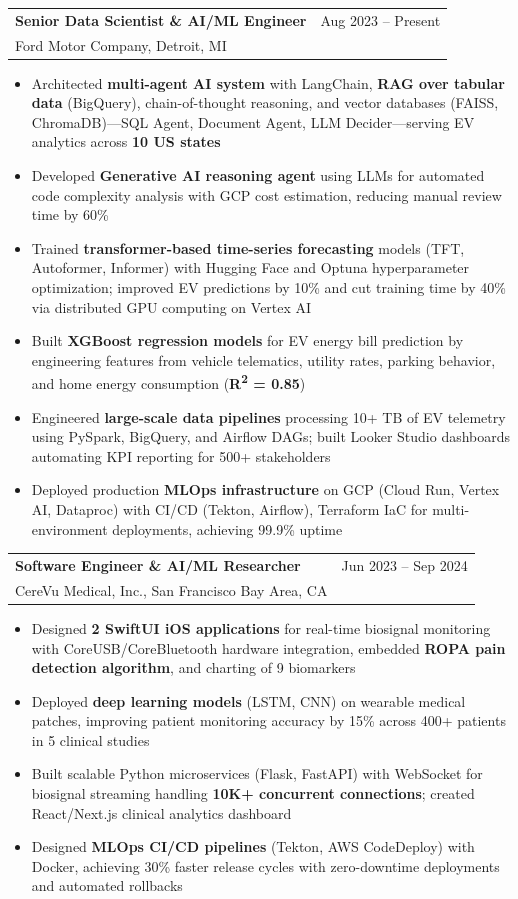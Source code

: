 \documentclass[11pt,letterpaper]{article}
\makeatletter
\newcommand{\cventry}[4]{%
  \noindent\begin{tabularx}{\textwidth}{@{}X r@{}}
    {\bfseries\color{headerblue}#1} & {\color{graytext}\small #2} \\
    {\color{accentcolor}\small #3} & \\
  \end{tabularx}%
  \vspace{0.02em}%
  #4%
  \vspace{0.25em}%
}
\makeatother
\begin{document}
\cventry{Senior Data Scientist \& AI/ML Engineer}{Aug 2023 -- Present}{Ford Motor Company, Detroit, MI}{
\begin{itemize}[leftmargin=0.5cm, itemsep=0.05cm, topsep=0.06cm, label={\color{headerblue}\textbullet}]
  \item Architected \textbf{multi-agent AI system} with LangChain, \textbf{RAG over tabular data} (BigQuery), chain-of-thought reasoning, and vector databases (FAISS, ChromaDB)---SQL Agent, Document Agent, LLM Decider---serving EV analytics across \textbf{10 US states}
  \item Developed \textbf{Generative AI reasoning agent} using LLMs for automated code complexity analysis with GCP cost estimation, reducing manual review time by 60\%
  \item Trained \textbf{transformer-based time-series forecasting} models (TFT, Autoformer, Informer) with Hugging Face and Optuna hyperparameter optimization; improved EV predictions by 10\% and cut training time by 40\% via distributed GPU computing on Vertex AI
  \item Built \textbf{XGBoost regression models} for EV energy bill prediction by engineering features from vehicle telematics, utility rates, parking behavior, and home energy consumption (\textbf{R\textsuperscript{2} = 0.85})
  \item Engineered \textbf{large-scale data pipelines} processing 10+ TB of EV telemetry using PySpark, BigQuery, and Airflow DAGs; built Looker Studio dashboards automating KPI reporting for 500+ stakeholders
  \item Deployed production \textbf{MLOps infrastructure} on GCP (Cloud Run, Vertex AI, Dataproc) with CI/CD (Tekton, Airflow), Terraform IaC for multi-environment deployments, achieving 99.9\% uptime
\end{itemize}
}

\cventry{Software Engineer \& AI/ML Researcher}{Jun 2023 -- Sep 2024}{CereVu Medical, Inc., San Francisco Bay Area, CA}{
\begin{itemize}[leftmargin=0.5cm, itemsep=0.05cm, topsep=0.06cm, label={\color{headerblue}\textbullet}]
  \item Designed \textbf{2 SwiftUI iOS applications} for real-time biosignal monitoring with CoreUSB/CoreBluetooth hardware integration, embedded \textbf{ROPA pain detection algorithm}, and charting of 9 biomarkers
  \item Deployed \textbf{deep learning models} (LSTM, CNN) on wearable medical patches, improving patient monitoring accuracy by 15\% across 400+ patients in 5 clinical studies
  \item Built scalable Python microservices (Flask, FastAPI) with WebSocket for biosignal streaming handling \textbf{10K+ concurrent connections}; created React/Next.js clinical analytics dashboard
  \item Designed \textbf{MLOps CI/CD pipelines} (Tekton, AWS CodeDeploy) with Docker, achieving 30\% faster release cycles with zero-downtime deployments and automated rollbacks
\end{itemize}
}
\end{document}
